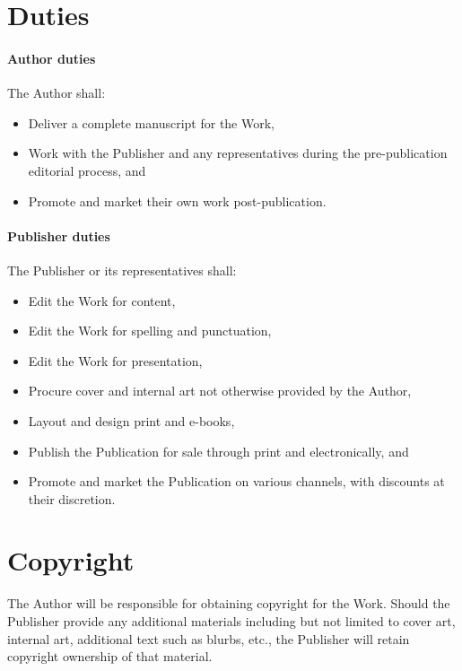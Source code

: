 \documentclass[12pt,letterpaper,oneside]{article}
\begin{document}
\section{Duties}

\paragraph{Author duties}

The Author shall:

\begin{itemize}
    \item Deliver a complete manuscript for the Work,
    \item Work with the Publisher and any representatives during the pre-publication editorial process, and
    \item Promote and market their own work post-publication.
\end{itemize}

\paragraph{Publisher duties}

The Publisher or its representatives shall:

\begin{itemize}
    \item Edit the Work for content,
    \item Edit the Work for spelling and punctuation,
    \item Edit the Work for presentation,
    \item Procure cover and internal art not otherwise provided by the Author,
    \item Layout and design print and e-books,
    \item Publish the Publication for sale through print and electronically, and
    \item Promote and market the Publication on various channels, with discounts at their discretion.
\end{itemize}

\section{Copyright}

The Author will be responsible for obtaining copyright for the Work. Should the Publisher provide any additional materials including but not limited to cover art, internal art, additional text such as blurbs, etc., the Publisher will retain copyright ownership of that material.
\end{document}
